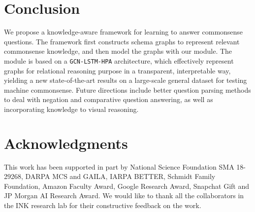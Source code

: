 \documentclass[11pt,a4paper]{article}
\begin{document}
\section{Conclusion}
We propose a knowledge-aware framework for learning to answer commonsense questions. The framework first constructs schema graphs to represent relevant commonsense knowledge, and then model the graphs with our \KagNet module. 
The module is based on a \texttt{GCN-LSTM-HPA} architecture, which effectively represent graphs for relational reasoning purpose in a transparent, interpretable way, yielding a new state-of-the-art results on a large-scale general dataset for testing machine commonsense.
Future directions include better question parsing methods to deal with negation and comparative question answering, as well as incorporating knowledge to visual reasoning. 






\section*{Acknowledgments}
This work has been supported in part by National Science Foundation SMA 18-29268, DARPA MCS and GAILA, IARPA BETTER, Schmidt Family Foundation, Amazon Faculty Award, Google Research Award, Snapchat Gift and JP Morgan AI Research Award. We would like to thank all the collaborators in the INK research lab for their constructive feedback on the work.


\end{document}
